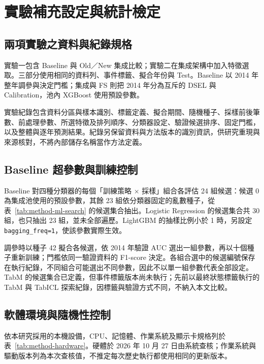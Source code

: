 \chapter{實驗補充設定與統計檢定}\label{app:experimental-details}
\begingroup
\setlength{\emergencystretch}{2em}

\section{兩項實驗之資料與紀錄規格}

實驗一包含 Baseline 與 Old／New 集成比較；實驗二在集成架構中加入特徵選取。三部分使用相同的資料列、事件標籤、擬合年份與 Test。Baseline 以 2014 年整年調參與決定門檻；集成與 FS 則把 2014 年分為互斥的 DSEL 與 Calibration，池內 XGBoost 使用預設參數。

實驗紀錄包含資料分區與樣本識別、標籤定義、擬合期間、隨機種子、採樣前後筆數、前處理參數、所選特徵及排列順序、分類器設定、驗證候選排序、固定門檻，以及整體與逐年預測結果。紀錄另保留資料與方法版本的識別資訊，供研究重現與來源核對，不將內部儲存名稱當作方法定義。

\section{Baseline 超參數與訓練控制}

Baseline 對四種分類器的每個「訓練策略 \ensuremath{\times} 採樣」組合各評估 24 組候選：候選 0 為集成池使用的預設參數，其餘 23 組依分類器固定的亂數種子，從表~\ref{tab:method-ml-search} 的候選集合抽出。Logistic Regression 的候選集合共 30 組，也只抽出 23 組，並未全部遍歷。LightGBM 的抽樣比例小於 1 時，另設定 \nolinkurl{bagging_freq=1}，使該參數實際生效。

調參時以種子 42 擬合各候選，依 2014 年驗證 AUC 選出一組參數，再以十個種子重新訓練；門檻依同一驗證資料的 F1-score 決定。各組合選中的候選編號保存在執行紀錄，不同組合可能選出不同參數，因此不以單一組參數代表全部設定。TabM 的候選集合已定義，但事件標籤版本尚未執行；先前以最終狀態標籤執行的 TabM 與 TabICL 探索紀錄，因標籤與驗證方式不同，不納入本文比較。

\section{軟體環境與隨機性控制}

依本研究採用的本機設備，CPU、記憶體、作業系統及顯示卡規格列於表~\ref{tab:method-hardware}。硬體於 2026 年 10 月 27 日由系統查核；作業系統與驅動版本列為本次查核值，不推定每次歷史執行都使用相同的更新版本。

